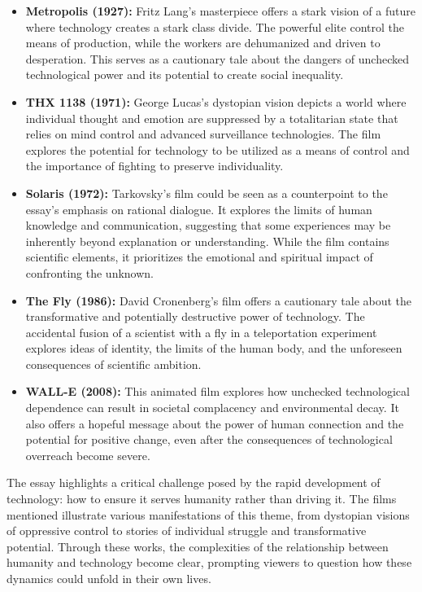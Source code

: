 \documentclass[11pt,fleqn]{book}
\begin{document}
\begin{itemize}
\item \textbf{Metropolis (1927):}  Fritz Lang's masterpiece offers a stark vision of a future where technology creates a stark class divide.  The powerful elite control the means of production, while the workers are dehumanized and driven to desperation. This serves as a cautionary tale about the dangers of unchecked technological power and its potential to create social inequality.

\item \textbf{THX 1138 (1971):} George Lucas's dystopian vision depicts a world where individual thought and emotion are suppressed by a totalitarian state that relies on mind control and advanced surveillance technologies. The film explores the potential for technology to be utilized as a means of control and the importance of fighting to preserve individuality. 

\item \textbf{Solaris (1972):}  Tarkovsky's film could be seen as a counterpoint to the essay's emphasis on rational dialogue. It explores the limits of human knowledge and communication, suggesting that some experiences may be inherently beyond explanation or understanding. While the film contains scientific elements, it prioritizes the emotional and spiritual impact of confronting the unknown.

\item \textbf{The Fly (1986):}  David Cronenberg's film offers a cautionary tale about the transformative and potentially destructive power of technology.  The accidental fusion of a scientist with a fly in a teleportation experiment explores ideas of identity, the limits of the human body, and the unforeseen consequences of scientific ambition.

\item \textbf{WALL-E (2008):} This animated film explores how unchecked technological dependence can result in societal complacency and environmental decay. It also offers a hopeful message about the power of human connection and the potential for positive change, even after the consequences of technological overreach become severe. 
\end{itemize}

\vspace{5pt}

The essay highlights a critical challenge posed by the rapid development of technology: how to ensure it serves humanity rather than driving it. The films mentioned illustrate various manifestations of this theme,  from dystopian visions of oppressive control to stories of individual struggle and transformative potential. Through these works, the complexities of the relationship between humanity and technology become clear, prompting viewers to question how these dynamics could unfold in their own lives. 
\end{document}
